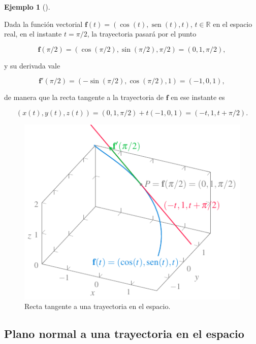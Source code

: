 \documentclass[
  a4paper,
]{scrreport}
\theoremstyle{definition}
\newtheorem{example}{Ejemplo}[chapter]
\theoremstyle{plain}
\theoremstyle{definition}
\theoremstyle{definition}
\theoremstyle{plain}
\theoremstyle{plain}
\theoremstyle{remark}
\begin{document}
\begin{example}[]\protect\hypertarget{exm-tangente-trayectoria-espacio}{}\label{exm-tangente-trayectoria-espacio}

Dada la función vectorial
\(\mathbf{f}(t)=(\cos(t), \operatorname{sen}(t), t)\),
\(t\in \mathbb{R}\) en el espacio real, en el instante \(t=\pi/2\), la
trayectoria pasará por el punto

\[
\mathbf{f}(\pi/2)=(\cos(\pi/2),\sin(\pi/2),\pi/2)=(0,1,\pi/2),
\]

y su derivada vale

\[
\mathbf{f}'(\pi/2)=(-\sin(\pi/2),\cos(\pi/2), 1)=(-1,0,1),
\]

de manera que la recta tangente a la trayectoria de \(\mathbf{f}\) en
ese instante es

\[
(x(t),y(t),z(t))=(0,1,\pi/2)+t(-1,0,1) = (-t,1,t+\pi/2).
\]

\begin{figure}[H]

{\centering \includegraphics{img/funciones-vectoriales/tangente-trayectoria-espacio.pdf}

}

\caption{Recta tangente a una trayectoria en el espacio.}

\end{figure}%

\end{example}

\subsection{Plano normal a una trayectoria en el
espacio}\label{plano-normal-a-una-trayectoria-en-el-espacio}
\end{document}
